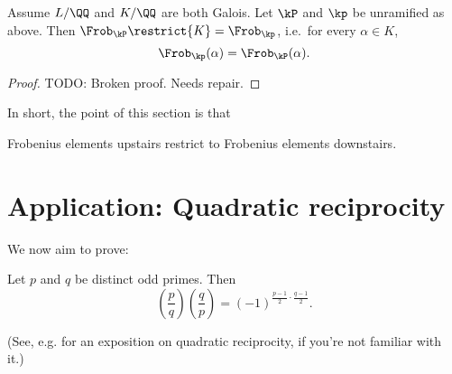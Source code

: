 \begin{theorem}
	Assume $L/\QQ$ and $K/\QQ$ are both Galois.
	Let $\kP$ and $\kp$ be unramified as above.
	Then $\Frob_{\kP} \restrict{K} = \Frob_{\kp}$,
	i.e.\ for every $\alpha \in K$,
	\[ \Frob_\kp(\alpha) = \Frob_{\kP}(\alpha). \]
\end{theorem}
\begin{proof}
	TODO: Broken proof. Needs repair.
\end{proof}
In short, the point of this section is that
\begin{moral}
	Frobenius elements upstairs restrict to Frobenius elements downstairs.
\end{moral}

\section{Application: Quadratic reciprocity}
We now aim to prove:
\begin{theorem}
	Let $p$ and $q$ be distinct odd primes.
	Then
	\[ \left( \frac pq \right)\left( \frac qp \right)
		= (-1)^{\frac{p-1}{2} \cdot \frac{q-1}{2}}. \]
\end{theorem}
(See, e.g. \cite{ref:holden} for an exposition on quadratic reciprocity,
if you're not familiar with it.)

